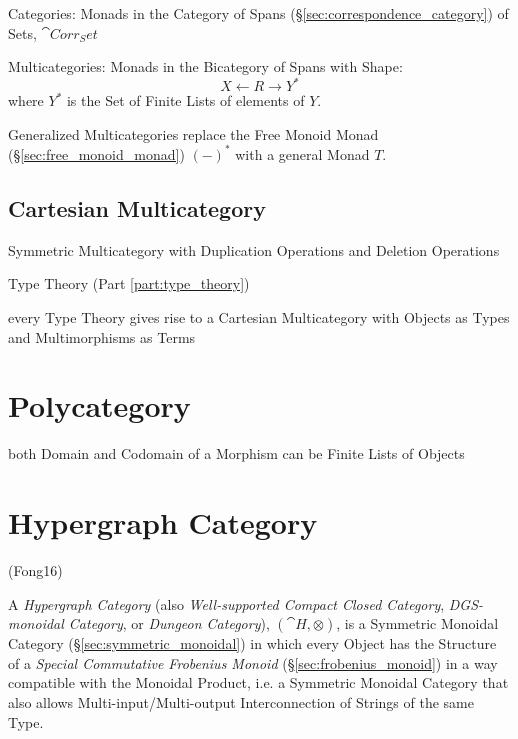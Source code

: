 Categories: Monads in the Category of Spans
(\S\ref{sec:correspondence_category}) of Sets, $\cat{Corr_Set}$

Multicategories: Monads in the Bicategory of Spans with Shape:
\[
  X \leftarrow R \rightarrow Y^*
\]
where $Y^*$ is the Set of Finite Lists of elements of $Y$.

Generalized Multicategories replace the Free Monoid Monad
(\S\ref{sec:free_monoid_monad}) $(-)^*$ with a general Monad $T$.



\subsection{Cartesian Multicategory}
\label{sec:cartesian_multicategory}

Symmetric Multicategory with Duplication Operations and Deletion
Operations

Type Theory (Part \ref{part:type_theory})

every Type Theory gives rise to a Cartesian Multicategory with Objects
as Types and Multimorphisms as Terms



\section{Polycategory}\label{sec:polycategory}

both Domain and Codomain of a Morphism can be Finite Lists of Objects



\section{Hypergraph Category}\label{sec:hypergraph_category}

(Fong16)

A \emph{Hypergraph Category} (also \emph{Well-supported Compact Closed
  Category}, \emph{DGS-monoidal Category}, or \emph{Dungeon
  Category}), $(\cat{H}, \otimes)$, is a Symmetric Monoidal Category
(\S\ref{sec:symmetric_monoidal}) in which every Object has the
Structure of a \emph{Special Commutative Frobenius Monoid}
(\S\ref{sec:frobenius_monoid}) in a way compatible with the Monoidal
Product, i.e. a Symmetric Monoidal Category that also allows
Multi-input/Multi-output Interconnection of Strings of the same Type.

